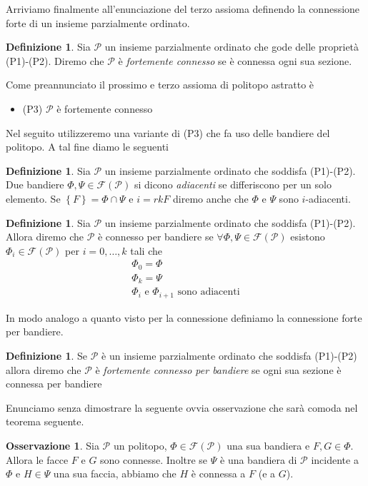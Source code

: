 \documentclass[a4paper,12pt]{report}
\newcommand{\p}{\mathcal{P}}
\theoremstyle{plain}
\theoremstyle{definition}
\newtheorem{defin}[teo]{Definizione}
\newtheorem{oss}[teo]{Osservazione}
\begin{document}
Arriviamo finalmente all'enunciazione del terzo assioma definendo la connessione forte di un insieme parzialmente ordinato.
\begin{defin}
Sia $\p$ un insieme parzialmente ordinato che gode delle propriet\`a (P1)-(P2). Diremo che $\p$ \`e \emph{fortemente connesso} se
\`e connessa ogni sua sezione.
\end{defin}
Come preannunciato il prossimo e terzo assioma di politopo astratto \`e
\begin{itemize}
\item (P3) $\p$ \`e fortemente connesso
\end{itemize}
Nel seguito utilizzeremo una variante di (P3) che fa uso delle bandiere del politopo. A tal fine diamo le seguenti
\begin{defin}
Sia $\p$ un insieme parzialmente ordinato che soddisfa (P1)-(P2). Due bandiere $\Phi,\Psi\in\mathcal{F}(\p)$ si dicono \emph{adiacenti}
se differiscono per un solo elemento. Se $\left\{F\right\}=\Phi\cap\Psi$ e $i=rkF$ diremo anche che $\Phi$ e $\Psi$ sono $i$-adiacenti.\\
\end{defin}
\begin{defin}
Sia $\p$ un insieme parzialmente ordinato che soddisfa (P1)-(P2). Allora diremo che $\p$ \`e connesso per bandiere se $\forall\Phi,\Psi\in\mathcal{F}(\p)$
esistono $\Phi_i\in\mathcal{F}(\p)$ per $i=0,\dots,k$ tali che
\begin{gather*}
\Phi_0=\Phi\\
\Phi_k=\Psi\\
\Phi_i\text{ e }\Phi_{i+1}\text{ sono adiacenti}
\end{gather*}
\end{defin}
In modo analogo a quanto visto per la connessione definiamo la connessione forte per bandiere.
\begin{defin}
Se $\p$ \`e un insieme parzialmente ordinato che soddisfa (P1)-(P2) allora diremo che $\p$ \`e \emph{fortemente connesso per bandiere} se
ogni sua sezione \`e connessa per bandiere
\end{defin}

Enunciamo senza dimostrare la seguente ovvia osservazione che sar\`a comoda nel teorema seguente.
\begin{oss}
Sia $\p$ un politopo, $\Phi\in\mathcal{F}(\p)$ una sua bandiera e $F,G\in\Phi$. Allora le facce $F$ e $G$ sono connesse. Inoltre se
$\Psi$ \`e una bandiera di $\p$ incidente a $\Phi$ e $H\in\Psi$ una sua faccia, abbiamo che $H$ \`e connessa a $F$ (e a $G$).
\end{oss}
\end{document}
